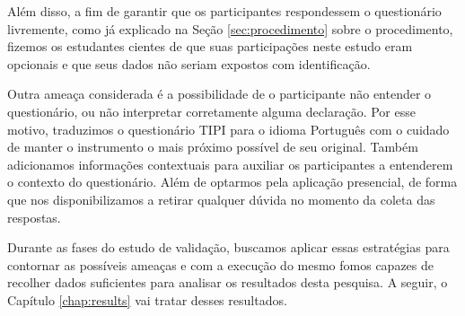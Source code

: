 Além disso, a fim de garantir que os participantes respondessem o questionário livremente, como já explicado na Seção \ref{sec:procedimento} sobre o procedimento, fizemos os estudantes cientes de que suas participações neste estudo eram opcionais e que seus dados não seriam expostos com identificação.

Outra ameaça considerada é a possibilidade de o participante não entender o questionário, ou não interpretar corretamente alguma declaração. Por esse motivo, traduzimos o questionário TIPI para o idioma Português com o cuidado de manter o instrumento o mais próximo possível de seu original. Também adicionamos informações contextuais para auxiliar os participantes a entenderem o contexto do questionário. Além de optarmos pela aplicação presencial, de forma que nos disponibilizamos a retirar qualquer dúvida no momento da coleta das respostas.

Durante as fases do estudo de validação, buscamos aplicar essas estratégias para contornar as possíveis ameaças e com a execução do mesmo fomos capazes de recolher dados suficientes para analisar os resultados desta pesquisa. A seguir, o Capítulo \ref{chap:results} vai tratar desses resultados.

